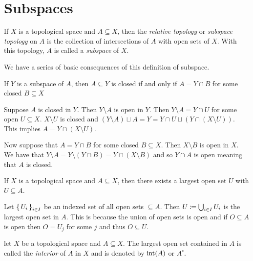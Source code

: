 \documentclass[letterpaper, 11pt, oneside]{book}
\begin{document}
\clearpage

\chapter{Subspaces}

\begin{defn}[Subspace]
  If $X$ is a topological space and $A \subseteq X$, then the \emph{relative topology} or \emph{subspace topology} on $A$ is the collection of intersections of $A$ with open sets of $X$.
  With this topology, $A$ is called a \emph{subspace} of $X$.
\end{defn}

We have a series of basic consequences of this definition of subspace.

\begin{prop}
  If $Y$ is a subspace of $A$, then $A \subseteq Y$ is closed if and only if $A = Y \cap B$ for some closed $B \subseteq X$
\end{prop}
\begin{pf}
  Suppose $A$ is closed in $Y$.
  Then $Y \setminus A$ is open in $Y$.
  Then $Y \setminus A = Y \cap U$ for some open $U \subseteq X$.
  $X \setminus U$ is closed and $(Y \setminus A) \sqcup A = Y = Y \cap U \sqcup (Y \cap (X \setminus U))$.
  This implies $A = Y \cap (X \setminus U)$.

  Now suppose that $A = Y \cap B$ for some closed $B \subseteq X$.
  Then $X \setminus B$ is open in $X$.
  We have that $Y \setminus A = Y \setminus (Y \cap B) = Y \cap (X \setminus B)$ and so $Y \cap A$ is open meaning that $A$ is closed.
\end{pf}

\begin{prop}
  If $X$ is a topological space and $A \subseteq X$, then there exists a largest open set $U$ with $U \subseteq A$.
\end{prop}
\begin{pf}
  Let $\set{U_{i}}_{i \in I}$ be an indexed set of all open sets $\subseteq A$.
  Then $U \coloneqq \bigcup_{i \in I} U_{i}$ is the largest open set in $A$.
  This is because the union of open sets is open and if $O \subseteq A$ is open then $O = U_{j}$ for some $j$ and thus $O \subseteq U$.
\end{pf}
\begin{defn}[Interior]
  let $X$ be a topological space and $A \subseteq X$.
  The largest open set contained in $A$ is called the \emph{interior} of $A$ in $X$ and is denoted by $\operatorname{int}(A)$ or $A^{\circ}$.
\end{defn}
\end{document}
